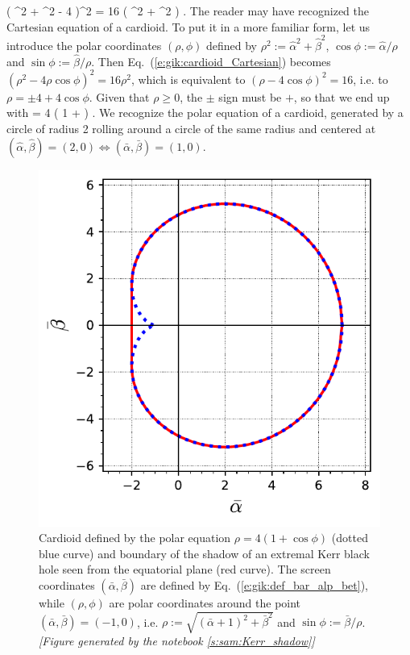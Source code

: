 \be \label{e:gik:cardioid_Cartesian}
   \left( \hat{\alpha}^2 + \hat{\beta}^2  - 4 \hat{\alpha} \right)^2 =
    16 \left(  \hat{\alpha}^2 + \hat{\beta}^2 \right) .
\ee
The reader may have recognized the Cartesian equation of a cardioid. To put it
in a more familiar form, let us introduce the polar coordinates $(\rho,\phi)$
defined by $\rho^2 := \hat{\alpha}^2 + \hat{\beta}^2$, $\cos\phi := \hat{\alpha}/\rho$
and $\sin\phi := \hat{\beta}/\rho$.
Then Eq.~(\ref{e:gik:cardioid_Cartesian}) becomes
$(\rho^2 - 4 \rho\cos\phi )^2 = 16 \rho^2$,
which is equivalent to $(\rho - 4\cos\phi)^2 = 16$, i.e.
to $\rho = \pm 4 + 4\cos\phi$.
Given that $\rho \geq 0$, the $\pm$ sign must be $+$, so that we end up with
\be
    \rho = 4 \left( 1 + \cos\phi \right) .
\ee
We recognize the polar equation of a cardioid, generated by a circle of radius 2 rolling around a
circle of the same radius and centered at $(\hat{\alpha},\hat{\beta}) = (2,0) \iff
(\bar{\alpha},\bar{\beta}) = (1, 0)$.

\begin{figure}
\centerline{
\includegraphics[height=0.28\textheight]{gik_shadow_cardioid.pdf} }
\caption[]{\label{f:gik:shadow_cardioid} \footnotesize
Cardioid defined by the polar equation $\rho = 4 \left( 1 + \cos\phi \right)$ (dotted blue curve)
and boundary of the shadow of an extremal Kerr black hole seen from the equatorial
plane (red curve). The screen coordinates $(\bar{\alpha},\bar{\beta})$ are
defined by Eq.~(\ref{e:gik:def_bar_alp_bet}), while $(\rho,\phi)$ are polar
coordinates around the point $(\bar{\alpha},\bar{\beta})=(-1,0)$, i.e.
$\rho := \sqrt{(\bar{\alpha}+1)^2 + \bar{\beta}^2}$ and $\sin\phi := \bar{\beta}/\rho$.
\textsl{[Figure generated by the notebook \ref{s:sam:Kerr_shadow}]}
}
\end{figure}

